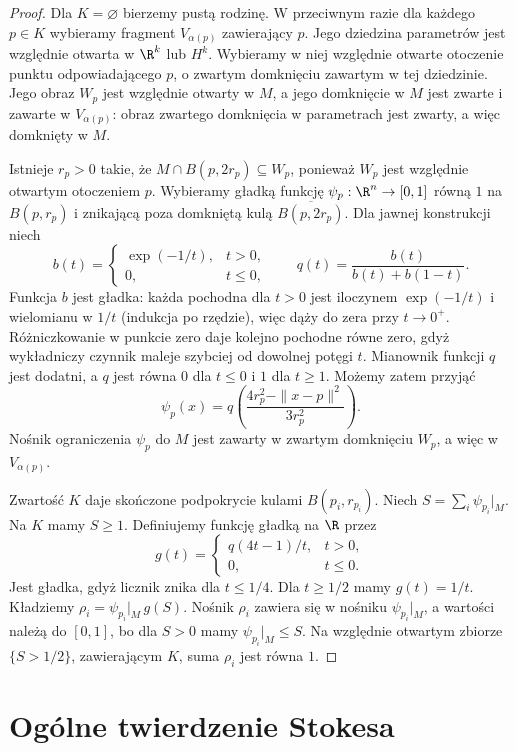 \begin{proof}
Dla $K=\varnothing$ bierzemy pustą rodzinę.
W przeciwnym razie dla każdego $p\in K$
wybieramy fragment $V_{\alpha(p)}$ zawierający $p$.
Jego dziedzina parametrów jest względnie otwarta
w $\R^k$ lub $H^k$. Wybieramy w niej względnie
otwarte otoczenie punktu odpowiadającego $p$,
o zwartym domknięciu zawartym w tej dziedzinie.
Jego obraz $W_p$ jest względnie otwarty w $M$,
a jego domknięcie w $M$ jest zwarte i zawarte
w $V_{\alpha(p)}$: obraz zwartego domknięcia
w parametrach jest zwarty, a więc domknięty w $M$.

Istnieje $r_p>0$ takie, że
$M\cap B(p,2r_p)\subseteq W_p$, ponieważ
$W_p$ jest względnie otwartym otoczeniem $p$.
Wybieramy gładką funkcję $\psi_p:\R^n\to[0,1]$
równą $1$ na $B(p,r_p)$ i znikającą
poza domkniętą kulą $\overline{B(p,2r_p)}$.
Dla jawnej konstrukcji niech
\[
 b(t)=
 \begin{cases}\exp(-1/t),&t>0,\\0,&t\le0,\end{cases}
 \qquad
 q(t)=\frac{b(t)}{b(t)+b(1-t)}.
\]
Funkcja $b$ jest gładka: każda pochodna
dla $t>0$ jest iloczynem $\exp(-1/t)$
i wielomianu w $1/t$ (indukcja po rzędzie),
więc dąży do zera przy $t\to0^+$.
Różniczkowanie w punkcie zero daje kolejno
pochodne równe zero, gdyż wykładniczy czynnik
maleje szybciej od dowolnej potęgi $t$.
Mianownik funkcji $q$ jest dodatni,
a $q$ jest równa $0$ dla $t\le0$
i $1$ dla $t\ge1$.
Możemy zatem przyjąć
\[
 \psi_p(x)=q\left(\frac{4r_p^2-\|x-p\|^2}{3r_p^2}\right).
\]
Nośnik ograniczenia $\psi_p$ do $M$
jest zawarty w zwartym domknięciu $W_p$,
a więc w $V_{\alpha(p)}$.

Zwartość $K$ daje skończone podpokrycie
kulami $B(p_i,r_{p_i})$. Niech
$S=\sum_i\psi_{p_i}|_M$.
Na $K$ mamy $S\ge1$.
Definiujemy funkcję gładką na $\R$ przez
\[
 g(t)=
 \begin{cases}q(4t-1)/t,&t>0,\\0,&t\le0.\end{cases}
\]
Jest gładka, gdyż licznik znika dla $t\le1/4$.
Dla $t\ge1/2$ mamy $g(t)=1/t$.
Kładziemy $\rho_i=\psi_{p_i}|_M\,g(S)$.
Nośnik $\rho_i$ zawiera się w nośniku
$\psi_{p_i}|_M$, a wartości należą do $[0,1]$,
bo dla $S>0$ mamy $\psi_{p_i}|_M\le S$.
Na względnie otwartym zbiorze $\{S>1/2\}$,
zawierającym $K$, suma $\rho_i$ jest równa $1$.
\end{proof}

\section{Ogólne twierdzenie Stokesa}

